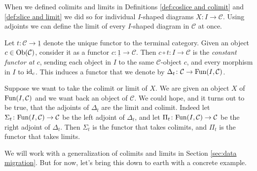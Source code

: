 \documentclass{book}
\def\tn{\textnormal}
\def\mc{\mathcal}
\def\Fun{\tn{Fun}}
\def\Ob{\tn{Ob}}
\def\to{\rightarrow}
\def\taking{\colon}
\def\ul{\underline}
\def\id{\tn{id}}
\def\mcC{\mc{C}}
\theoremstyle{remark}
\theoremstyle{definition}
\begin{document}
When we defined colimits and limits in Definitions \ref{def:coslice and colimit} and \ref{def:slice and limit} we did so for individual $I$-shaped diagrams $X\taking I\to\mcC$. Using adjoints we can define the limit of every $I$-shaped diagram in $\mcC$ at once.

Let $t\taking\mcC\to\ul{1}$ denote the unique functor to the terminal category. Given an object $c\in\Ob(\mcC)$, consider it as a functor $c\taking\ul{1}\to\mcC$. Then $c\circ t\taking I\to\mcC$ is the {\em constant functor at $c$}, sending each object in $I$ to the same $\mcC$-object $c$, and every morphism in $I$ to $\id_c$. This induces a functor that we denote by $\Delta_t\taking\mcC\to\Fun(I,\mcC)$.

Suppose we want to take the colimit or limit of $X$. We are given an object $X$ of $\Fun(I,\mcC)$ and we want back an object of $\mcC$. We could hope, and it turns out to be true, that the adjoints of $\Delta_t$ are the limit and colimit. Indeed let $\Sigma_t\taking\Fun(I,\mcC)\to\mcC$ be the left adjoint of $\Delta_t$, and let $\Pi_t\taking\Fun(I,\mcC)\to\mcC$ be the right adjoint of $\Delta_t$. Then $\Sigma_t$ is the functor that takes colimits, and $\Pi_t$ is the functor that takes limits.

We will work with a generalization of colimits and limits in Section \ref{sec:data migration}. But for now, let's bring this down to earth with a concrete example.
\end{document}
